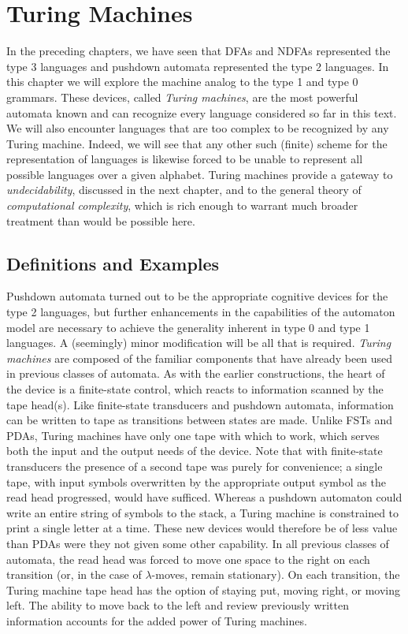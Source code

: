 \chapter{Turing Machines}\label{ch-11}

In the preceding chapters, we have seen that DFAs and NDFAs represented
the type 3 languages and pushdown automata represented the type 2
languages. In this chapter we will explore the machine analog to
the type 1 and type 0 grammars.  These devices, called \emph{Turing
machines}, are the most powerful automata known and can recognize
every language considered so far in this text. We will also encounter
languages that are too complex to be recognized by any Turing
machine. Indeed, we will see that any other such (finite) scheme
for the representation of languages is likewise forced to be unable
to represent all possible languages over a given alphabet. Turing
machines provide a gateway to \emph{undecidability}, discussed in the next
chapter, and to the general theory of \emph{computational complexity},
which is rich enough to warrant much broader treatment than would
be possible here.

\section{Definitions and Examples}\label{sec-11.1}

Pushdown automata turned out to be the appropriate cognitive devices
for the type 2 languages, but further enhancements in the capabilities
of the automaton model are necessary to achieve the generality
inherent in type 0 and type 1 languages. A (seemingly) minor
modification will be all that is required. \emph{Turing machines} are
composed of the familiar components that have already been used
in previous classes of automata. As with the earlier constructions,
the heart of the device is a finite-state control, which reacts to
information scanned by the tape head(s).  Like finite-state transducers
and pushdown automata, information can be written to tape as
transitions between states are made. Unlike FSTs and PDAs, Turing
machines have only one tape with which to work, which serves both
the input and the output needs of the device. Note that with
finite-state transducers the presence of a second tape was purely
for convenience; a single tape, with input symbols overwritten by
the appropriate output symbol as the read head progressed, would
have sufficed.  Whereas a pushdown automaton could write an entire
string of symbols to the stack, a Turing machine is constrained to
print a single letter at a time.  These new devices would therefore
be of less value than PDAs were they not given some other capability.
In all previous classes of automata, the read head was forced to
move one space to the right on each transition (or, in the case of
$\lambda$-moves, remain stationary).  On each transition, the Turing machine
tape head has the option of staying put, moving right, or moving
left. The ability to move back to the left and review previously
written information accounts for the added power of Turing machines.

